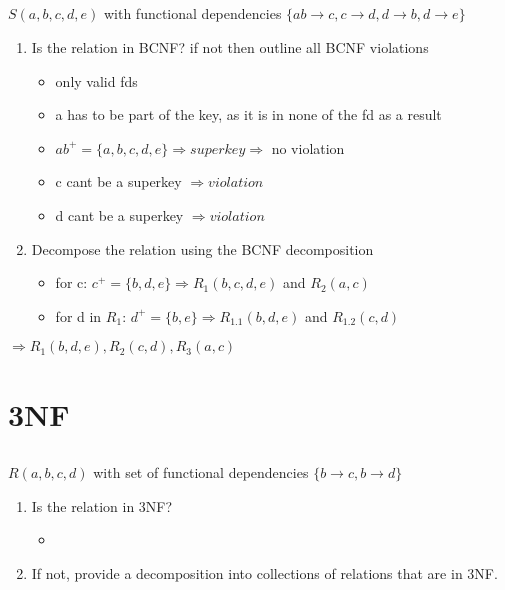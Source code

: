 \documentclass{article}
\begin{document}
\subsection*{} $S(a, b, c, d, e)$ with functional dependencies
    $\{ab \rightarrow c, c \rightarrow d, d \rightarrow b, d \rightarrow e\}$
\begin{enumerate}
    \item Is the relation in BCNF? if not then outline all BCNF violations
        \begin{itemize}
            \item only valid fds
            \item a has to be part of the key, as it is in none of the fd as a result
            \item $ab^{+} = \{a, b, c, d, e\} \Rightarrow superkey \Rightarrow$ no violation
            \item c cant be a superkey $\Rightarrow violation$
            \item d cant be a superkey $\Rightarrow violation$
        \end{itemize}
    \item Decompose the relation using the BCNF decomposition
        \begin{itemize}
            \item for c: $c^{+} = \{b, d, e\} \Rightarrow R_{1}(b, c, d, e)$ and $R_{2}(a, c)$
            \item for d in $R_{1}$: $d^{+} = \{b, e\} \Rightarrow R_{1.1}(b, d, e)$ and $R_{1.2}(c, d)$
        \end{itemize}
\end{enumerate}
$\Rightarrow R_{1}(b, d, e), R_{2}(c, d), R_{3}(a, c)$

\section{3NF}
\subsection*{} $R(a, b, c, d)$ with set of functional dependencies $\{b \rightarrow c, b \rightarrow d\}$
\begin{enumerate}
    \item Is the relation in 3NF?
        \begin{itemize}
            \item 
        \end{itemize}
    \item If not, provide a decomposition into collections of relations that are in 3NF.
\end{enumerate}
\end{document}
